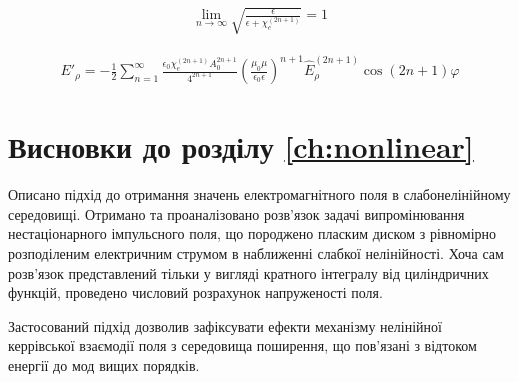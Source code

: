 \begin{equation*} \begin{aligned}
\lim_{n \to \infty} 
\sqrt{ \frac{\epsilon}{ \epsilon + \chi_e^{(2n+1)}} } = 1
\end{aligned} \end{equation*}



\begin{equation*} \begin{aligned}
E'_\rho = - \frac{1}{2} \sum_{n=1}^{\infty} 
\frac{\epsilon_0 \chi_e^{(2n+1)} A_0^{2n+1} }{ 4^{2n+1} }
\left( \frac{\mu_0 \mu}{\epsilon_0 \epsilon} \right)^{n+1}
\hat{E}_\rho^{(2n+1)} \cos (2n + 1) \varphi
\end{aligned} \end{equation*}

\section*{Висновки до розділу \ref{ch:nonlinear}}

Описано підхід до отримання значень електромагнітного поля в слабонелінійному 
середовищі. Отримано та проаналізовано розв’язок задачі випромінювання 
нестаціонарного імпульсного поля, що породжено пласким диском з рівномірно 
розподіленим електричним струмом в наближенні слабкої нелінійності. Хоча сам 
розв’язок представлений тільки у вигляді кратного інтегралу від циліндричних 
функцій, проведено числовий розрахунок напруженості поля.

Застосований підхід дозволив зафіксувати ефекти механізму нелінійної керрівської 
взаємодії поля з середовища поширення, що пов'язані з відтоком енергії до 
мод вищих порядків.

